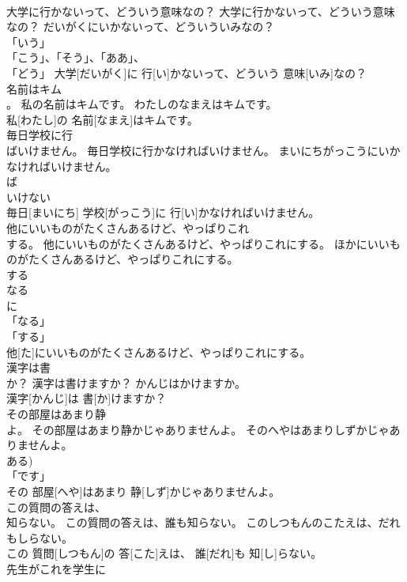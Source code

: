\documentclass[8pt]{extreport}
\begin{document}
\begin{CJK}{UTF8}{min}
\\	大学に行かないって、どういう意味なの？	大学に行かないって、どういう意味なの？	だいがくにいかないって、どういういみなの？	
\\	「いう」 
\\	「こう」、「そう」、「ああ」、
\\	「どう」	大学[だいがく]に 行[い]かないって、どういう 意味[いみ]なの？		
\\	名前はキム
\\	。	私の名前はキムです。	わたしのなまえはキムです。	
\\	私[わたし]の 名前[なまえ]はキムです。		
\\	毎日学校に行
\\	ばいけません。	毎日学校に行かなければいけません。	まいにちがっこうにいかなければいけません。	
\\	ば
\\	いけない
\\	毎日[まいにち] 学校[がっこう]に 行[い]かなければいけません。		
\\	他にいいものがたくさんあるけど、やっぱりこれ
\\	する。	他にいいものがたくさんあるけど、やっぱりこれにする。	ほかにいいものがたくさんあるけど、やっぱりこれにする。	
\\	する 
\\	なる 
\\	に 
\\	「なる」 
\\	「する」 
\\	他[た]にいいものがたくさんあるけど、やっぱりこれにする。		
\\	漢字は書
\\	か？	漢字は書けますか？	かんじはかけますか。	
\\	漢字[かんじ]は 書[か]けますか？		
\\	その部屋はあまり静
\\	よ。	その部屋はあまり静かじゃありませんよ。	そのへやはあまりしずかじゃありませんよ。	
\\	ある)	
\\	「です」 
\\	その 部屋[へや]はあまり 静[しず]かじゃありませんよ。		
\\	この質問の答えは、
\\	知らない。	この質問の答えは、誰も知らない。	このしつもんのこたえは、だれもしらない。	
\\	この 質問[しつもん]の 答[こた]えは、 誰[だれ]も 知[し]らない。		
\\	先生がこれを学生に

\end{CJK}
\end{document}

